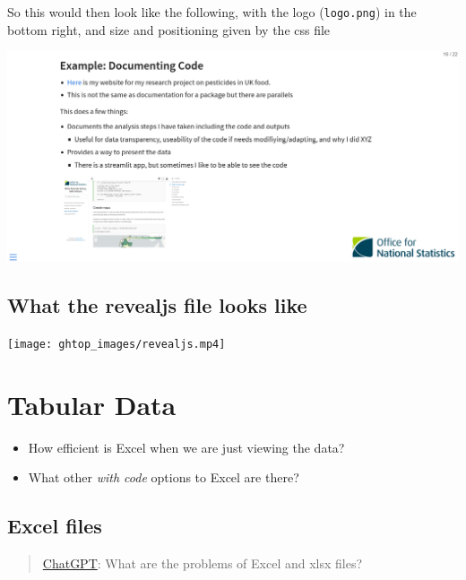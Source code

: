 \documentclass[
  letterpaper,
  DIV=11,
  numbers=noendperiod]{scrartcl}
\providecommand{\tightlist}{%
  \setlength{\itemsep}{0pt}\setlength{\parskip}{0pt}}\usepackage{longtable,booktabs,array}
\begin{document}
So this would then look like the following, with the logo
(\texttt{logo.png}) in the bottom right, and size and positioning given
by the css file

\includegraphics{ghtop_images/ppt_revealstyle.png}

\hypertarget{what-the-revealjs-file-looks-like}{%
\subsection{What the revealjs file looks
like}\label{what-the-revealjs-file-looks-like}}

\texttt{[image: ghtop\_images/revealjs.mp4]}

\hypertarget{tabular-data}{%
\section{Tabular Data}\label{tabular-data}}

\begin{itemize}
\tightlist
\item
  How efficient is Excel when we are just viewing the data?
\item
  What other \emph{with code} options to Excel are there?
\end{itemize}

\hypertarget{excel-files}{%
\subsection{Excel files}\label{excel-files}}

\begin{quote}
\href{https://chat.openai.com/chat}{ChatGPT}: What are the problems of
Excel and xlsx files?
\end{quote}
\end{document}
